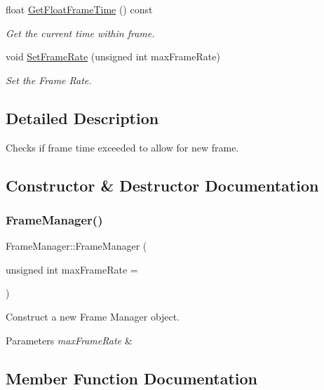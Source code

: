 \begin{DoxyCompactItemize}
float \hyperlink{classFrameManager_af8cee1b8a5061051f09d5e2623586d2e}{Get\+Float\+Frame\+Time} () const
\begin{DoxyCompactList}\small\item\em Get the current time within frame. \end{DoxyCompactList}\item 
void \hyperlink{classFrameManager_a449eb9187116086d6a5ee53c76c84852}{Set\+Frame\+Rate} (unsigned int max\+Frame\+Rate)
\begin{DoxyCompactList}\small\item\em Set the Frame Rate. \end{DoxyCompactList}\end{DoxyCompactItemize}


\subsection{Detailed Description}
Checks if frame time exceeded to allow for new frame. 

\subsection{Constructor \& Destructor Documentation}
\mbox{\label{classFrameManager_a717a67bb21670ce5b9916701e88fddfd}} 
\subsubsection{\texorpdfstring{Frame\+Manager()}{FrameManager()}}
{\footnotesize\ttfamily Frame\+Manager\+::\+Frame\+Manager (\begin{DoxyParamCaption}\item[{unsigned int}]{max\+Frame\+Rate = {} }\end{DoxyParamCaption})}



Construct a new Frame Manager object. 


\begin{DoxyParams}{Parameters}
{\em max\+Frame\+Rate} & \\
\hline
\end{DoxyParams}


\subsection{Member Function Documentation}
\mbox{\label{classFrameManager_af8cee1b8a5061051f09d5e2623586d2e}} 
